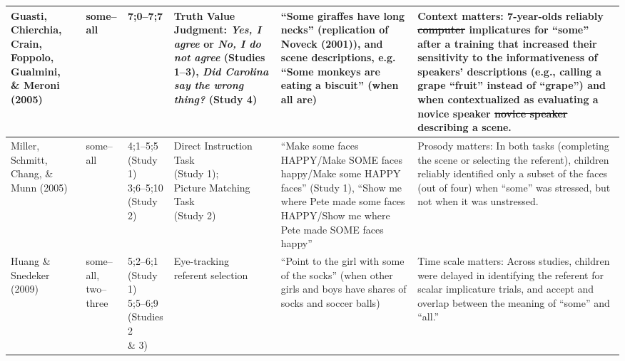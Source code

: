 \documentclass[man]{apa2}
\providecommand{\DIFadd}[1]{{\protect\color{blue}\uwave{#1}}} %
\providecommand{\DIFdel}[1]{{\protect\color{red}\sout{#1}}}                      %
\providecommand{\DIFaddFL}[1]{\DIFadd{#1}} %
\providecommand{\DIFdelFL}[1]{\DIFdel{#1}} %
\providecommand{\DIFaddbeginFL}{} %
\providecommand{\DIFaddendFL}{} %
\providecommand{\DIFdelbeginFL}{} %
\providecommand{\DIFdelendFL}{} %
\begin{document}
{\begin{landscape}
\begin{table}[!ht]
\begin{tabular}{| p{2.2cm} | p{2cm} | p{1.69cm} | p{4.5cm} | p{5cm} | p{7.2cm} |}
\parbox[t]{2.2cm}{Guasti, Chierchia, Crain, Foppolo, Gualmini,\\\& Meroni (2005)} & some--all & 7;0--7;7 & Truth Value Judgment: \textit{Yes, I agree} or \textit{No, I do not agree} (Studies 1--3), \textit{Did Carolina say the wrong thing?} (Study 4) & ``Some giraffes have long necks'' (replication of Noveck (2001)), and scene descriptions, e.g. ``Some monkeys are eating a biscuit'' (when all are) & Context matters: 7-year-olds reliably \DIFdelbeginFL \DIFdelFL{computer }\DIFdelendFL \DIFaddbeginFL \DIFaddFL{compute }\DIFaddendFL implicatures for ``some'' after a training that increased their sensitivity to the informativeness of speakers' descriptions (e.g., calling a grape ``fruit'' instead of ``grape'') and when contextualized as evaluating a novice speaker \DIFdelbeginFL \DIFdelFL{novice speaker }\DIFdelendFL describing a scene.\\ \hline
Miller, Schmitt, Chang, \& Munn (2005) & some--all & \parbox[t]{1.69cm}{4;1--5;5\\(Study 1)\\ 3;6--5;10\\(Study 2)} & \parbox[t]{4.5cm}{Direct Instruction Task\\(Study 1);\\Picture Matching Task\\(Study 2)} & ``Make some faces HAPPY/Make SOME faces happy/Make some HAPPY faces'' (Study 1), ``Show me where Pete made some faces HAPPY/Show me where Pete made SOME faces happy'' & Prosody matters: In both tasks (completing the scene or selecting the referent), children reliably identified only a subset of the faces (out of four) when ``some'' was stressed, but not when it was unstressed.\\ \hline
\parbox[t]{2.2cm}{Huang \&\\Snedeker (2009)} & \parbox[t]{2cm}{some--all,\\two--three} &\parbox[t]{1.69cm}{5;2--6;1\\(Study 1)\\5;5--6;9 \\(Studies 2\\\& 3)} & \parbox[t]{4.5cm}{Eye-tracking\\referent selection} & ``Point to the girl with some of the socks'' (when other girls and boys have shares of socks and soccer balls) & Time scale matters: Across studies, children were delayed in identifying the referent for scalar implicature trials, and accept and overlap between the meaning of ``some'' and ``all.'' \\ \hline

\end{tabular}
\end{table}
\end{landscape}}
\end{document}
